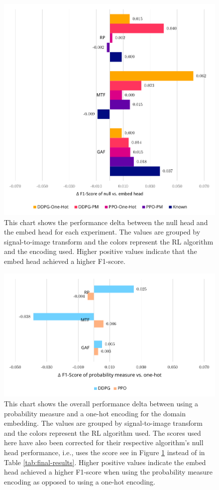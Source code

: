 \begin{figure}
	\centering
	\includegraphics[width=6in]{figures/results_delta}
	\caption{This chart shows the performance delta between the null head and the embed head for each experiment. The values are grouped by signal-to-image transform and the colors represent the RL algorithm and the encoding used. Higher positive values indicate that the embed head achieved a higher F1-score.}
	\label{fig:results-delta}
\end{figure}

\begin{figure}
	\centering
	\includegraphics[width=6in]{figures/results_encoding}
	\caption{This chart shows the overall performance delta between using a probability measure and a one-hot encoding for the domain embedding. The values are grouped by signal-to-image transform and the colors represent the RL algorithm used. The scores used here have also been corrected for their respective algorithm's null head performance, i.e., uses the score see in Figure \ref{fig:results-delta} instead of in Table \ref{tab:final-results}. Higher positive values indicate the embed head achieved a higher F1-score when using the probability measure encoding as opposed to using a one-hot encoding.}
	\label{fig:results-encoding}
\end{figure}

